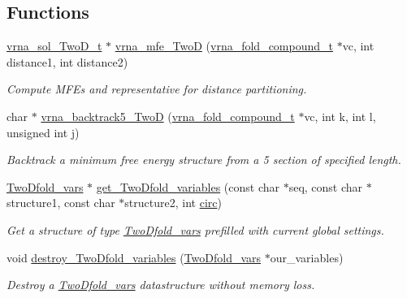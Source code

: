 \subsection*{Functions}
\begin{DoxyCompactItemize}
\item 
\hyperlink{group__kl__neighborhood__mfe_structvrna__sol__TwoD__t}{vrna\+\_\+sol\+\_\+\+Two\+D\+\_\+t} $\ast$ \hyperlink{group__kl__neighborhood__mfe_ga243c288b463147352829df04de6a2f77}{vrna\+\_\+mfe\+\_\+\+TwoD} (\hyperlink{group__fold__compound_ga1b0cef17fd40466cef5968eaeeff6166}{vrna\+\_\+fold\+\_\+compound\+\_\+t} $\ast$vc, int distance1, int distance2)
\begin{DoxyCompactList}\small\item\em Compute M\+FE\textquotesingle{}s and representative for distance partitioning. \end{DoxyCompactList}\item 
char $\ast$ \hyperlink{group__kl__neighborhood__mfe_ga15a96fc96f4f4c2e01a11b3e17d1ef43}{vrna\+\_\+backtrack5\+\_\+\+TwoD} (\hyperlink{group__fold__compound_ga1b0cef17fd40466cef5968eaeeff6166}{vrna\+\_\+fold\+\_\+compound\+\_\+t} $\ast$vc, int k, int l, unsigned int j)
\begin{DoxyCompactList}\small\item\em Backtrack a minimum free energy structure from a 5\textquotesingle{} section of specified length. \end{DoxyCompactList}\item 
\hyperlink{group__kl__neighborhood__mfe_structTwoDfold__vars}{Two\+Dfold\+\_\+vars} $\ast$ \hyperlink{group__kl__neighborhood__mfe_gac9284f132cf0eaa0a2f43590eda05488}{get\+\_\+\+Two\+Dfold\+\_\+variables} (const char $\ast$seq, const char $\ast$structure1, const char $\ast$structure2, int \hyperlink{group__model__details_gaf9202a1a09f5828dc731e2d9a10fa111}{circ})
\begin{DoxyCompactList}\small\item\em Get a structure of type \hyperlink{group__kl__neighborhood__mfe_structTwoDfold__vars}{Two\+Dfold\+\_\+vars} prefilled with current global settings. \end{DoxyCompactList}\item 
void \hyperlink{group__kl__neighborhood__mfe_ga05bf4f31d216b1b160fd2d3d68e9b487}{destroy\+\_\+\+Two\+Dfold\+\_\+variables} (\hyperlink{group__kl__neighborhood__mfe_structTwoDfold__vars}{Two\+Dfold\+\_\+vars} $\ast$our\+\_\+variables)
\begin{DoxyCompactList}\small\item\em Destroy a \hyperlink{group__kl__neighborhood__mfe_structTwoDfold__vars}{Two\+Dfold\+\_\+vars} datastructure without memory loss. \end{DoxyCompactList}\item 

\end{DoxyCompactItemize}
